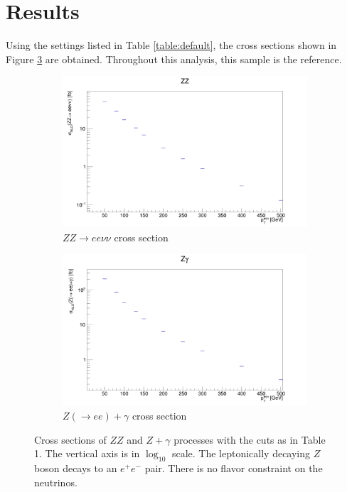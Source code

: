 \documentclass[11pt,a4paper,final]{report}
\begin{document}
\section{Results}
Using the settings listed in Table \ref{table:default}, the cross sections shown in Figure \ref{xsecs} are obtained. Throughout this analysis, this sample is the reference.
\begin{figure}[H]
\centering
	\begin{subfigure}{0.49\textwidth}
		\includegraphics[width=\linewidth]{ZZ_xsec.png}
		\caption{$ZZ\rightarrow ee\nu\nu$ cross section}
		\label{subfig:ZeeZvv}
	\end{subfigure}	
	\begin{subfigure}{0.49\textwidth}
		\includegraphics[width=\linewidth]{Zg_xsec.png}
		\caption{$Z(\rightarrow ee)+\gamma$ cross section}
		\label{subfig:Zeeg}	
	\end{subfigure}
	\caption{Cross sections of $ZZ$ and $Z+\gamma$ processes with the cuts as in Table 1. The vertical axis is in $\log_{10}$ scale. The leptonically decaying $Z$ boson decays to an $e^+e^-$ pair. There is no flavor constraint on the neutrinos.}
	\label{xsecs}
\end{figure}
\end{document}
